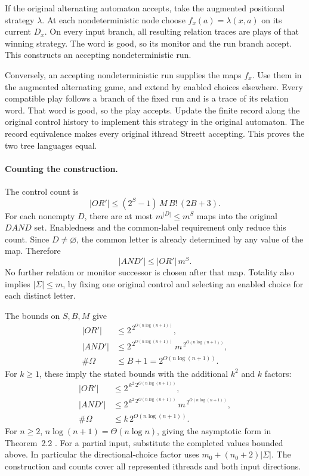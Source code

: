 If the original alternating
automaton accepts, take
the augmented positional
strategy \(\lambda\).
At each nondeterministic
node choose
\(f_x(a)=\lambda(x,a)\)
on its current \(D_x\).
On every input branch,
all resulting relation
traces are plays of
that winning strategy.
The word is good,
so its monitor and
the run branch accept.
This constructs an
accepting nondeterministic
run.

Conversely, an accepting
nondeterministic run supplies
the maps \(f_x\).
Use them in the
augmented alternating game,
and extend by enabled
choices elsewhere.
Every compatible play
follows a branch of
the fixed run and
is a trace of its
relation word.
That word is good,
so the play accepts.
Update the finite record
along the original
control history to
implement this strategy
in the original automaton.
The record equivalence
makes every original
ithread Streett accepting.
This proves the two
tree languages equal.

\paragraph{Counting the construction.}
The control count is
\[
 |OR'|\leq(2^S-1)\,M\,B!\,(2B+3).
\]
For each nonempty \(D\),
there are at most
\(m^{|D|}\leq m^S\)
maps into the original
\(DAND\) set.
Enabledness and the
common-label requirement
only reduce this count.
Since \(D\ne\varnothing\),
the common letter is
already determined by
any value of the map.
Therefore
\[
 |AND'|\leq |OR'|\,m^S.
\]
No further relation or
monitor successor is
chosen after that map.
Totality also implies
\(|\Sigma|\leq m\),
by fixing one original
control and selecting
an enabled choice for
each distinct letter.

The bounds on \(S,B,M\)
give
\[
\begin{aligned}
 |OR'|&\leq2^{\,2^{O(n\log(n+1))}},\\
 |AND'|&\leq2^{\,2^{O(n\log(n+1))}}\,
                         m^{\,2^{O(n\log(n+1))}},\\
 \#\Omega&\leq B+1
                  =2^{O(n\log(n+1))}.
\end{aligned}
\]
For \(k\geq1\), these
imply the stated bounds
with the additional
\(k^2\) and \(k\)
factors:
\[
\begin{aligned}
 |OR'|&\leq2^{\,k^2\,2^{O(n\log(n+1))}},\\
 |AND'|&\leq2^{\,k^2\,2^{O(n\log(n+1))}}\,
                         m^{\,2^{O(n\log(n+1))}},\\
 \#\Omega&\leq k\,2^{O(n\log(n+1))}.
\end{aligned}
\]
For \(n\geq2\),
\(n\log(n+1)=\Theta(n\log n)\),
giving the asymptotic
form in Theorem~2.2
\cite[\S2.1]{EmersonJutla1991}.
For a partial input,
substitute the completed
values bounded above.
In particular the
directional-choice factor
uses
\(m_0+(n_0+2)|\Sigma|\).
The construction and
counts cover all
represented ithreads and
both input directions.

